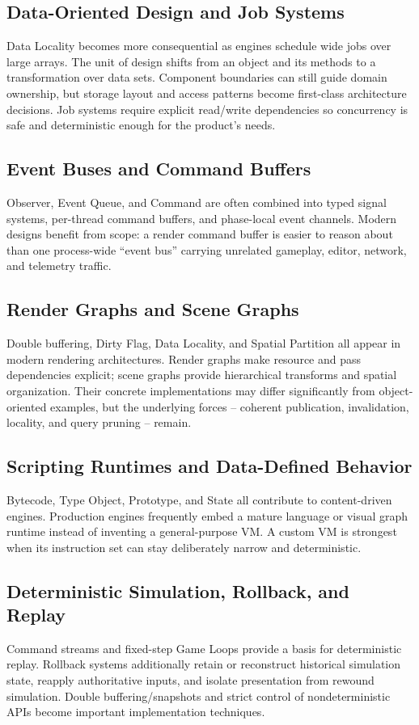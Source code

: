 \documentclass[11pt]{article}
\begin{document}
\subsection{Data-Oriented Design and Job Systems}
Data Locality becomes more consequential as engines schedule wide jobs over large arrays. The unit of design shifts from an object and its methods to a transformation over data sets. Component boundaries can still guide domain ownership, but storage layout and access patterns become first-class architecture decisions. Job systems require explicit read/write dependencies so concurrency is safe and deterministic enough for the product's needs.

\subsection{Event Buses and Command Buffers}
Observer, Event Queue, and Command are often combined into typed signal systems, per-thread command buffers, and phase-local event channels. Modern designs benefit from scope: a render command buffer is easier to reason about than one process-wide ``event bus'' carrying unrelated gameplay, editor, network, and telemetry traffic.

\subsection{Render Graphs and Scene Graphs}
Double buffering, Dirty Flag, Data Locality, and Spatial Partition all appear in modern rendering architectures. Render graphs make resource and pass dependencies explicit; scene graphs provide hierarchical transforms and spatial organization. Their concrete implementations may differ significantly from object-oriented examples, but the underlying forces -- coherent publication, invalidation, locality, and query pruning -- remain.

\subsection{Scripting Runtimes and Data-Defined Behavior}
Bytecode, Type Object, Prototype, and State all contribute to content-driven engines. Production engines frequently embed a mature language or visual graph runtime instead of inventing a general-purpose VM. A custom VM is strongest when its instruction set can stay deliberately narrow and deterministic.

\subsection{Deterministic Simulation, Rollback, and Replay}
Command streams and fixed-step Game Loops provide a basis for deterministic replay. Rollback systems additionally retain or reconstruct historical simulation state, reapply authoritative inputs, and isolate presentation from rewound simulation. Double buffering/snapshots and strict control of nondeterministic APIs become important implementation techniques.
\end{document}
